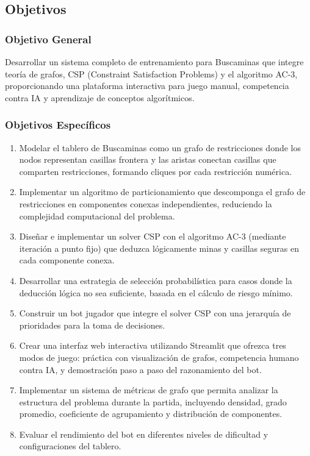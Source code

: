 \documentclass[12pt,a4paper]{article}
\begin{document}
\subsection{Objetivos}

\subsubsection{Objetivo General}

Desarrollar un sistema completo de entrenamiento para Buscaminas que integre teoría de grafos, CSP (Constraint Satisfaction Problems) y el algoritmo AC-3, proporcionando una plataforma interactiva para juego manual, competencia contra IA y aprendizaje de conceptos algorítmicos.

\subsubsection{Objetivos Específicos}

\begin{enumerate}[itemsep=2pt]
    \item Modelar el tablero de Buscaminas como un grafo de restricciones donde los nodos representan casillas frontera y las aristas conectan casillas que comparten restricciones, formando cliques por cada restricción numérica.

    \item Implementar un algoritmo de particionamiento que descomponga el grafo de restricciones en componentes conexas independientes, reduciendo la complejidad computacional del problema.

    \item Diseñar e implementar un solver CSP con el algoritmo AC-3 (mediante iteración a punto fijo) que deduzca lógicamente minas y casillas seguras en cada componente conexa.

    \item Desarrollar una estrategia de selección probabilística para casos donde la deducción lógica no sea suficiente, basada en el cálculo de riesgo mínimo.

    \item Construir un bot jugador que integre el solver CSP con una jerarquía de prioridades para la toma de decisiones.

    \item Crear una interfaz web interactiva utilizando Streamlit que ofrezca tres modos de juego: práctica con visualización de grafos, competencia humano contra IA, y demostración paso a paso del razonamiento del bot.

    \item Implementar un sistema de métricas de grafo que permita analizar la estructura del problema durante la partida, incluyendo densidad, grado promedio, coeficiente de agrupamiento y distribución de componentes.

    \item Evaluar el rendimiento del bot en diferentes niveles de dificultad y configuraciones del tablero.
\end{enumerate}
\end{document}
